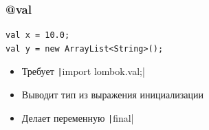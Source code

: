\documentclass[xetex,mathserif,serif]{beamer}
\begin{document}
	\begin{frame}[fragile]
		\frametitle{@val}
		\begin{verbatim}
val x = 10.0;
val y = new ArrayList<String>();
		\end{verbatim}
		\begin{itemize}
			\item Требует \texttt|import lombok.val;|
			\item Выводит тип из выражения инициализации
			\item Делает переменную \texttt|final|
		\end{itemize}
	\end{frame}
\end{document}
